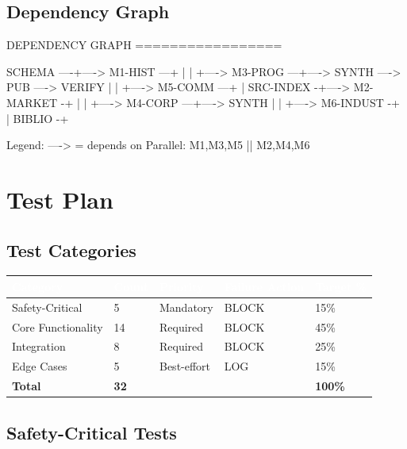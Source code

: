 \documentclass[11pt,letterpaper]{article}
\newcommand{\tableheader}[1]{\textbf{\sffamily\textcolor{white}{#1}}}
\begin{document}
\subsection{Dependency Graph}

\begin{asciibox}
DEPENDENCY GRAPH
=================

  SCHEMA ----+----> M1-HIST ---+
             |                  |
             +----> M3-PROG ---+----> SYNTH ----> PUB ----> VERIFY
             |                  |
             +----> M5-COMM ---+
             |
  SRC-INDEX -+----> M2-MARKET -+
             |                  |
             +----> M4-CORP ---+----> SYNTH
             |                  |
             +----> M6-INDUST -+
                                      |
                               BIBLIO -+

  Legend: ----> = depends on
  Parallel: {M1,M3,M5} || {M2,M4,M6}
\end{asciibox}

\section{Test Plan}

\subsection{Test Categories}

\begin{center}
\begin{tabularx}{\textwidth}{L{2.5cm}C{1.5cm}C{1.5cm}C{2cm}C{1.5cm}}
\toprule
{}
\tableheader{Category} & \tableheader{Count} & \tableheader{Priority} & \tableheader{Failure Action} & \tableheader{Target \%} \\
\midrule
Safety-Critical & 5 & Mandatory & BLOCK & 15\% \\
Core Functionality & 14 & Required & BLOCK & 45\% \\
Integration & 8 & Required & BLOCK & 25\% \\
Edge Cases & 5 & Best-effort & LOG & 15\% \\
\midrule
\textbf{Total} & \textbf{32} & & & \textbf{100\%} \\
\bottomrule
\end{tabularx}
\end{center}

\subsection{Safety-Critical Tests}
\end{document}
